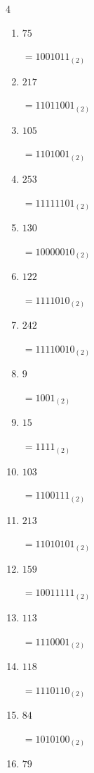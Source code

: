 \begin{multicols}{4}
\begin{enumerate}
        $=11111111_{(2)}$

  \item $75$

        $=1001011_{(2)}$

  \item $217$

        $=11011001_{(2)}$

  \item $105$

        $=1101001_{(2)}$

  \item $253$

        $=11111101_{(2)}$

\columnbreak %

  \item $130$

        $=10000010_{(2)}$

  \item $122$

        $=1111010_{(2)}$

  \item $242$

        $=11110010_{(2)}$

  \item $9$

        $=1001_{(2)}$

  \item $15$

        $=1111_{(2)}$

  \item $103$

        $=1100111_{(2)}$

  \item $213$

        $=11010101_{(2)}$

  \item $159$

        $=10011111_{(2)}$

  \item $113$

        $=1110001_{(2)}$

  \item $118$

        $=1110110_{(2)}$

  \item $84$

        $=1010100_{(2)}$

  \item $79$


\end{enumerate}
\end{multicols}
